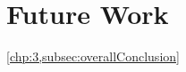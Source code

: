 \documentclass[../Dissertation]{subfiles}
\begin{document}
\section{Future Work}\label{sec:future_work}
    \lipsum[64-65]
    
    \lipsum[64] \cref{chp:3,subsec:overallConclusion} \lipsum[64]
    
    \lipsum[64]
\end{document}
